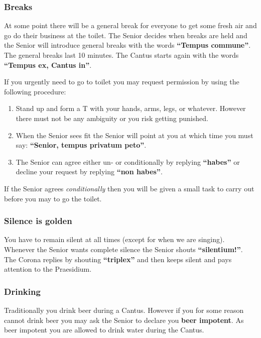 \subsubsection*{Breaks}
At some point there will be a general break for everyone to get some fresh air and go do their business at the toilet. The Senior decides when breaks are held and the Senior will introduce general breaks with the words \textbf{``Tempus commune''}. The general breaks last 10 minutes. The Cantus starts again with the words \textbf{``Tempus ex, Cantus in''}.

If you urgently need to go to toilet you may request permission by using the following procedure:
\begin{enumerate}
        \item Stand up and form a T with your hands, arms, legs, or whatever. However there must not be any ambiguity or you risk getting punished.
        \item When the Senior sees fit the Senior will point at you at which time you must say: \textbf{``Senior, tempus privatum peto''}.
        \item The Senior can agree either un- or conditionally by replying \textbf{``habes''} or decline your request by replying \textbf{``non habes''}.
\end{enumerate}
If the Senior agrees \emph{conditionally} then you will be given a small task to carry out before you may to go the toilet.

\subsubsection*{Silence is golden}
You have to remain silent at all times (except for when we are singing).
Whenever the Senior wants complete silence the Senior shouts \textbf{``silentium!''}. The Corona replies by shouting \textbf{``triplex''} and then keeps silent and pays attention to the Praesidium.

\subsubsection*{Drinking}
Traditionally you drink beer during a Cantus.
However if you for some reason cannot drink beer you may ask the Senior to declare you \textbf{beer impotent}. As beer impotent you are allowed to drink water during the Cantus.

